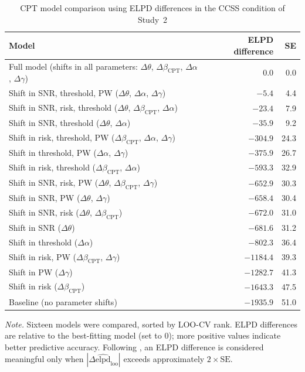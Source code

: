 \documentclass[man,floatsintext]{apa7}
\begin{document}
\begin{table}[!htbp]
\centering
\begin{threeparttable}\small
\caption{CPT model comparison using ELPD differences in the CCSS condition of Study~2}
\label{tab:cpt_mc_ccss_study2}
\begin{tabularx}{\linewidth}{@{} >{\raggedright\arraybackslash}X rr @{}}
\toprule
\textbf{Model} & \textbf{ELPD difference} & \textbf{SE} \\
\midrule
Full model (shifts in all parameters: $\Delta\theta$, $\Delta\beta_{\text{CPT}}$, $\Delta\alpha$, $\Delta\gamma$) & 0.0 & 0.0 \\
Shift in SNR, threshold, PW ($\Delta\theta$, $\Delta\alpha$, $\Delta\gamma$) & $-5.4$ & 4.4 \\
Shift in SNR, risk, threshold ($\Delta\theta$, $\Delta\beta_{\text{CPT}}$, $\Delta\alpha$) & $-23.4$ & 7.9 \\
Shift in SNR, threshold ($\Delta\theta$, $\Delta\alpha$) & $-35.9$ & 9.2 \\
Shift in risk, threshold, PW ($\Delta\beta_{\text{CPT}}$, $\Delta\alpha$, $\Delta\gamma$) & $-304.9$ & 24.3 \\
Shift in threshold, PW ($\Delta\alpha$, $\Delta\gamma$) & $-375.9$ & 26.7 \\
Shift in risk, threshold ($\Delta\beta_{\text{CPT}}$, $\Delta\alpha$) & $-593.3$ & 32.9 \\
Shift in SNR, risk, PW ($\Delta\theta$, $\Delta\beta_{\text{CPT}}$, $\Delta\gamma$) & $-652.9$ & 30.3 \\
Shift in SNR, PW ($\Delta\theta$, $\Delta\gamma$) & $-658.4$ & 30.4 \\
Shift in SNR, risk ($\Delta\theta$, $\Delta\beta_{\text{CPT}}$) & $-672.0$ & 31.0 \\
Shift in SNR ($\Delta\theta$) & $-681.6$ & 31.2 \\
Shift in threshold ($\Delta\alpha$) & $-802.3$ & 36.4 \\
Shift in risk, PW ($\Delta\beta_{\text{CPT}}$, $\Delta\gamma$) & $-1184.4$ & 39.3 \\
Shift in PW ($\Delta\gamma$) & $-1282.7$ & 41.3 \\
Shift in risk ($\Delta\beta_{\text{CPT}}$) & $-1643.3$ & 47.5 \\
Baseline (no parameter shifts) & $-1935.9$ & 51.0 \\
\bottomrule
\end{tabularx}
\begin{tablenotes}
\item \textit{Note.} Sixteen models were compared, sorted by LOO-CV rank. ELPD differences are relative to the best-fitting model (set to 0); more positive values indicate better predictive accuracy. Following \textcite{vehtari_practical_2017}, an ELPD difference is considered meaningful only when $|\Delta\widehat{\mathrm{elpd}}_{\mathrm{loo}}|$ exceeds approximately $2 \times \mathrm{SE}$. 
\end{tablenotes}
\end{threeparttable}
\end{table}
\end{document}
